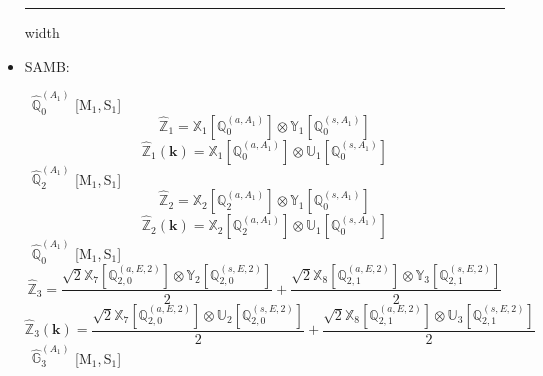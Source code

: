 \documentclass[fleqn,10pt,landscape]{article}
\begin{document}
\begin{itemize}
 \hfil \hrule height 1mm width \textwidth \hfil

\item SAMB:

\vspace{4mm}
\noindent {} $\,\,\,\hat{\mathbb{Q}}_{0}^{(A_{1})}$ [M$_{1}$,\,S$_{1}$]
\begin{dmath*}
\hat{\mathbb{Z}}_{1}=\mathbb{X}_{1}[\mathbb{Q}_{0}^{(a,A_{1})}] \otimes\mathbb{Y}_{1}[\mathbb{Q}_{0}^{(s,A_{1})}]
\end{dmath*}
\begin{dmath*}
\hat{\mathbb{Z}}_{1}(\bm{k})=\mathbb{X}_{1}[\mathbb{Q}_{0}^{(a,A_{1})}] \otimes\mathbb{U}_{1}[\mathbb{Q}_{0}^{(s,A_{1})}]
\end{dmath*}
\vspace{4mm}
\noindent {} $\,\,\,\hat{\mathbb{Q}}_{2}^{(A_{1})}$ [M$_{1}$,\,S$_{1}$]
\begin{dmath*}
\hat{\mathbb{Z}}_{2}=\mathbb{X}_{2}[\mathbb{Q}_{2}^{(a,A_{1})}] \otimes\mathbb{Y}_{1}[\mathbb{Q}_{0}^{(s,A_{1})}]
\end{dmath*}
\begin{dmath*}
\hat{\mathbb{Z}}_{2}(\bm{k})=\mathbb{X}_{2}[\mathbb{Q}_{2}^{(a,A_{1})}] \otimes\mathbb{U}_{1}[\mathbb{Q}_{0}^{(s,A_{1})}]
\end{dmath*}
\vspace{4mm}
\noindent {} $\,\,\,\hat{\mathbb{Q}}_{0}^{(A_{1})}$ [M$_{1}$,\,S$_{1}$]
\begin{dmath*}
\hat{\mathbb{Z}}_{3}=\frac{\sqrt{2} \mathbb{X}_{7}[\mathbb{Q}_{2,0}^{(a,E,2)}] \otimes\mathbb{Y}_{2}[\mathbb{Q}_{2,0}^{(s,E,2)}]}{2} + \frac{\sqrt{2} \mathbb{X}_{8}[\mathbb{Q}_{2,1}^{(a,E,2)}] \otimes\mathbb{Y}_{3}[\mathbb{Q}_{2,1}^{(s,E,2)}]}{2}
\end{dmath*}
\begin{dmath*}
\hat{\mathbb{Z}}_{3}(\bm{k})=\frac{\sqrt{2} \mathbb{X}_{7}[\mathbb{Q}_{2,0}^{(a,E,2)}] \otimes\mathbb{U}_{2}[\mathbb{Q}_{2,0}^{(s,E,2)}]}{2} + \frac{\sqrt{2} \mathbb{X}_{8}[\mathbb{Q}_{2,1}^{(a,E,2)}] \otimes\mathbb{U}_{3}[\mathbb{Q}_{2,1}^{(s,E,2)}]}{2}
\end{dmath*}
\vspace{4mm}
\noindent {} $\,\,\,\hat{\mathbb{G}}_{3}^{(A_{1})}$ [M$_{1}$,\,S$_{1}$]

\end{itemize}
\end{document}
